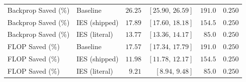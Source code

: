 \documentclass{article}
\newcommand{\win}[1]{\cellcolor{tgwin}#1}
\theoremstyle{plain}
\theoremstyle{definition}
\theoremstyle{remark}
\begin{document}
\begin{longtable}{llrrrr}
Backprop Saved (\%) & Baseline & \win{$26.25$} & $[25.90,\,26.59]$ & $191.0$ & $0.250$ \\
Backprop Saved (\%) & IES (shipped) & \win{$17.89$} & $[17.60,\,18.18]$ & $154.5$ & $0.250$ \\
Backprop Saved (\%) & IES (literal) & \win{$13.77$} & $[13.36,\,14.17]$ & $85.0$ & $0.250$ \\
FLOP Saved (\%) & Baseline & \win{$17.57$} & $[17.34,\,17.79]$ & $191.0$ & $0.250$ \\
FLOP Saved (\%) & IES (shipped) & \win{$11.98$} & $[11.78,\,12.17]$ & $154.5$ & $0.250$ \\
FLOP Saved (\%) & IES (literal) & \win{$9.21$} & $[8.94,\,9.48]$ & $85.0$ & $0.250$ \\
\end{longtable}
\endgroup
\twocolumn
\end{document}
